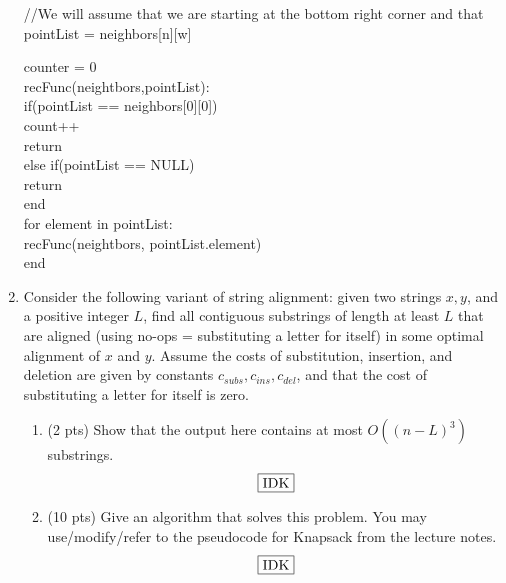\documentclass[12pt]{article}
\newcommand\tab[1][1cm]{\hspace*{#1}}
\begin{document}
\begin{enumerate}
//We will assume that we are starting at the bottom right corner and that pointList = neighbors[n][w]

\tab counter = 0\\
\tab recFunc(neightbors,pointList):\\
\tab \tab if(pointList == neighbors[0][0])\\
\tab \tab \tab count++\\
\tab \tab \tab return\\
\tab \tab else if(pointList == NULL)\\
\tab \tab \tab return \\
\tab end\\
\tab for element in pointList:\\
\tab \tab recFunc(neightbors, pointList.element)\\
\tab end\\




\pagebreak

\item Consider the following variant of string alignment: given two strings $x,y$, and a positive integer $L$, find all contiguous substrings of length at least $L$ that are aligned (using no-ops = substituting a letter for itself) in some optimal alignment of $x$ and $y$. Assume the costs of substitution, insertion, and deletion are given by constants $c_{subs}, c_{ins}, c_{del}$, and that the cost of substituting a letter for itself is zero.

\begin{enumerate}
\item \label{4a} (2 pts) Show that the output here contains at most $O((n-L)^3)$ substrings.
$$\fbox{IDK}$$
\pagebreak

\item \label{4b} (10 pts) Give an algorithm that solves this problem. You may use/modify/refer to the pseudocode for Knapsack from the lecture notes.
$$\fbox{IDK}$$
\pagebreak
		
\end{enumerate}



	

\end{enumerate}
\end{document}
